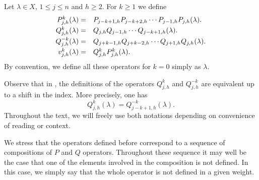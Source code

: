 \begin{definition}\rm\label{def: words over weights} 
    Let $\lambda \in X$, $1\leq j \leq n $ and $h\geq 2$. 
    For $k\geq 1$ we define
    \begin{equation}
    \begin{array}{rl} 
        P^k_{j,h} (\lambda) = &P_{j-k+1,h}P_{j-k+2,h}\cdots P_{j-1,h}P_{j,h}(\lambda).\\ [3pt]
        Q^{k}_{j,h} (\lambda) =& Q_{j,h}Q_{j-1,h}\cdots Q_{j-k+1,h}(\lambda).\\[3pt]
        Q^{-k}_{j,h} (\lambda) =& Q_{j+k-1,h}Q_{j+k-2,h}\cdots Q_{j+1,h}Q_{j,h}(\lambda).\\[3pt]
        v^k_{j,h}(\lambda) =&  Q^{k}_{j,h} P^k_{j,h} (\lambda).
    \end{array}
    \end{equation}
  By convention, we define all these operators for $k=0$ simply as $\lambda$. 
\end{definition}
\begin{remark}\rm
    Observe that in , the definitions of the operators $Q^{k}_{j,h}$ and $Q^{-k}_{j,h}$ are equivalent up to a shift in the index. More precisely, one has
    \begin{equation}
        Q^{k}_{j,h}(\lambda) = Q^{-k}_{j-k+1,h}(\lambda).
    \end{equation}
    Throughout the text, we will freely use both notations depending on convenience of reading or context.
\end{remark}

    
We stress that the operators defined before correspond to a sequence of compositions of $P$ and $Q$ operators. Throughout these sequence it may well be the case that one of the elements involved in the composition is not defined. In this case, we simply say that the whole operator is not defined in a given weight. 

